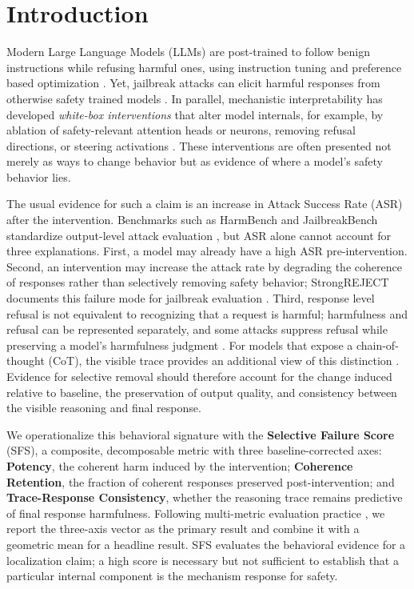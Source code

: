 \section{Introduction}
\label{sec:intro}
Modern Large Language Models (LLMs) are post-trained to follow benign instructions while refusing harmful ones, using instruction tuning and preference based optimization \citep{ouyang2022training,bai2022constitutional}. Yet, jailbreak attacks can elicit harmful responses from otherwise safety trained models \citep{wei2023jailbroken,zou2023universal}. In parallel, mechanistic interpretability has developed \emph{white-box interventions} that alter model internals, for example, by ablation of safety-relevant attention heads or neurons, removing refusal directions, or steering activations \citep{zhou2024ships, zhao2025neuron, arditi2024refusal}. These interventions are often presented not merely as ways to change behavior but as evidence of where a model's safety behavior lies.

The usual evidence for such a claim is an increase in Attack Success Rate (ASR) after the intervention. Benchmarks such as HarmBench and JailbreakBench standardize output-level attack evaluation \citep{mazeika2024harmbench,chao2024jailbreakbench}, but ASR alone cannot account for three explanations. First, a model may already have a high ASR pre-intervention. Second, an intervention may increase the attack rate by degrading the coherence of responses rather than selectively removing safety behavior; StrongREJECT documents this failure mode for jailbreak evaluation \citep{souly2024strongreject}. Third, response level refusal is not equivalent to recognizing that a request is harmful; harmfulness and refusal can be represented separately, and some attacks suppress refusal while preserving a model's harmfulness judgment \citep{zhao2025harmfulnessrefusal}. For models that expose a chain-of-thought (CoT), the visible trace provides an additional view of this distinction \citep{baker2025cotmonitoring,korbak2025monitorability,turpin2023unfaithful}. Evidence for selective removal should therefore account for the change induced relative to baseline, the preservation of output quality, and consistency between the visible reasoning and final response.  

We operationalize this behavioral signature with the \textbf{Selective Failure Score} (SFS), a composite, decomposable metric with three baseline-corrected axes: \textbf{Potency}, the coherent harm induced by the intervention; \textbf{Coherence Retention}, the fraction of coherent responses preserved post-intervention; and \textbf{Trace-Response Consistency}, whether the reasoning trace remains predictive of final response harmfulness. Following multi-metric evaluation practice \citep{liang2023helm}, we report the three-axis vector as the primary result and combine it with a geometric mean for a headline result. SFS evaluates the behavioral evidence for a localization claim; a high score is necessary but not sufficient to establish that a particular internal component is the mechanism response for safety. 

